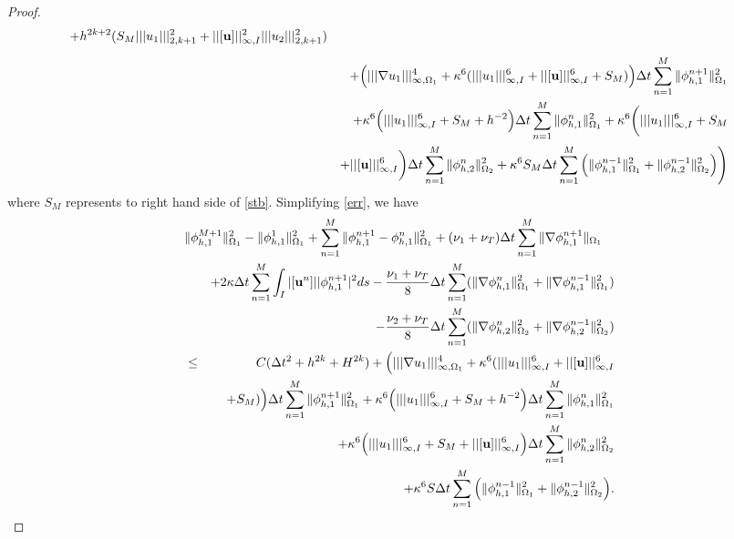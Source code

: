 \documentclass[10pt]{article}%
\numberwithin{equation}{section}
\begin{document}
\begin{proof}
\begin{eqnarray}
	+h^{2k+2}(S_M|||u_{1}|||_{2,k+1}^2+||[{\bf u}]||^2_{\infty,I}|||u_{2}|||_{2,k+1}^2)\nonumber\\[5pt]
	&&+\Big(|||\nabla u_{1}|||_{\infty,\Omega_1}^{4}+\kappa^{6}(|||u_1|||^{6}_{\infty,I}+||[{\bf u}]||^{6}_{\infty,I}+S_M)\Big)\Delta t\sum_{n=1}^{M}\|\phi_{h,1}^{n+1}\|_{\Omega_1}^2\nonumber\\&&+\kappa^{6}\Big(|||u_1|||^{6}_{\infty,I}+S_M+h^{-2}\Big)\Delta t\sum_{n=1}^{M}\|\phi_{h,1}^n\|^2_{\Omega_1}+\kappa^{6}\bigg(|||u_1|||^{6}_{\infty,I}+S_M\nonumber\allowdisplaybreaks\\&&+||[{\bf u}]||^{6}_{\infty,I}\bigg)\Delta t\sum_{n=1}^{M}\|\phi_{h,2}^n\|^2_{\Omega_2}+\kappa^{6}S_M\Delta t\sum_{n=1}^{M}\Big(\|{\bf \phi}_{h,1}^{n-1}\|^2_{\Omega_1}+\|{\bf \phi}_{h,2}^{n-1}\|^2_{\Omega_2}\Big)\allowdisplaybreaks
	\Bigg)\label{err}
	\end{eqnarray}
	where $S_M$ represents to right hand side of \eqref{stb}.	Simplifying \eqref{err}, we have
	\begin{eqnarray}
	\lefteqn{{\|\phi_{h,1}^{M+1}\|_{\Omega_1}^2-\|\phi_{h,1}^{1}\|_{\Omega_1}^2} +\sum_{n=1}^{M}\|\phi_{h,1}^{n+1}-\phi_{h,1}^{n}\|_{\Omega_1}^2 +(\nu_1+\nu_T)\Delta t\sum_{n=1}^{M}\|\nabla  \phi_{h,1}^{n+1}\|_{\Omega_1}}
	\nonumber\\&&+2\kappa\Delta t \sum_{n=1}^{M}\int_{I}|[{\bf u}^n]|  |\phi_{h,1}^{n+1}|^2ds-\frac{{ \nu_1+\nu_T}}{8}\Delta t\sum_{n=1}^{M}(\|\nabla{\bf \phi}_{h,1}^n\|^2_{\Omega_1}+\|\nabla {\bf \phi}_{h,1}^{n-1}\|^2_{\Omega_1})\nonumber\allowdisplaybreaks\\&&-\frac{{ \nu_2+\nu_T}}{8}\Delta t\sum_{n=1}^{M}(\|\nabla{\bf \phi}_{h,2}^n\|^2_{\Omega_2}+\|\nabla {\bf \phi}_{h,2}^{n-1}\|^2_{\Omega_2})\nonumber\allowdisplaybreaks\\&\leq& C(\Delta t^2+h^{2k}+H^{2k})+\Big(|||\nabla u_{1}|||_{\infty,\Omega_1}^{4}+\kappa^{6}(|||u_1|||^{6}_{\infty,I}+||[{\bf u}]||^{6}_{\infty,I}\nonumber\\&&+S_M)\Big)\Delta t\sum_{n=1}^{M}\|\phi_{h,1}^{n+1}\|_{\Omega_1}^2+\kappa^{6}\Big(|||u_1|||^{6}_{\infty,I}+S_M+h^{-2}\Big)\Delta t\sum_{n=1}^{M}\|\phi_{h,1}^n\|^2_{\Omega_1}\nonumber\\&&+\kappa^{6}\Big(|||u_1|||^{6}_{\infty,I}+S_M+||[{\bf u}]||^{6}_{\infty,I}\Big)\Delta t\sum_{n=1}^{M}\|\phi_{h,2}^n\|^2_{\Omega_2}\nonumber\\&&+\kappa^{6}S\Delta t\sum_{n=1}^{M}\Big(\|{\bf \phi}_{h,1}^{n-1}\|^2_{\Omega_1}+\|{\bf \phi}_{h,2}^{n-1}\|^2_{\Omega_2}\Big)\allowdisplaybreaks. \label{err24}
	\end{eqnarray}

\end{proof}
\end{document}
